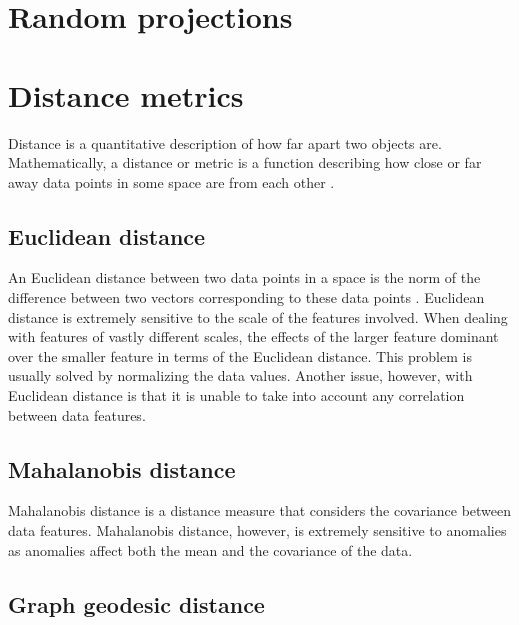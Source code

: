 
\section{Random projections}
\label{sec:randomProjections}

\section{Distance metrics}
\label{sec:distanceMetrics}
Distance is a quantitative description of how far apart two objects are. 
Mathematically, a distance or metric is a function describing how close or far 
away data points in some space are from each other \cite{KHOA12}.

\subsection{Euclidean distance}
\label{sec:distanceMetrics:euclideanDistance}
An Euclidean distance between two data points in a space is the norm of the 
difference between two vectors corresponding to these data points \cite{KHOA12}.
Euclidean distance is extremely sensitive to the scale of the features involved.
When dealing with features of vastly different scales, the effects of the larger
feature dominant over the smaller feature in terms of the Euclidean distance. 
This problem is usually solved by normalizing the data values. Another issue, 
however, with Euclidean distance is that it is unable to take into account any 
correlation between data features.

\subsection{Mahalanobis distance}
\label{sec:distanceMetrics:mahalanobisDistance}
Mahalanobis distance is a distance measure that considers the covariance between
data features. Mahalanobis distance, however, is extremely sensitive to 
anomalies as anomalies affect both the mean and the covariance of the data.

\subsection{Graph geodesic distance}
\label{sec:distanceMetrics:graphGeodesicDistance}

